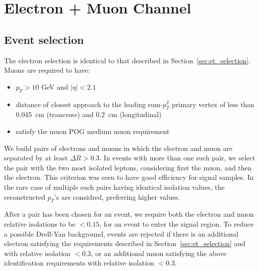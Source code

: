 \section{Electron + Muon Channel}\label{sec:eMu}

\subsection{Event selection}\label{sec:em_selection}


The electron selection is identical to that described in
Section~\ref{sec:et_selection}.  Muons are required to have:
\begin{itemize}
  \item $p_{T} > 10$ GeV and $\vert \eta \vert < 2.1$
  \item distance of closest approach to the leading sum-$p_T^2$ 
    primary vertex of less than 0.045~cm (transvese) and 0.2~cm (longitudinal)
  \item satisfy the muon POG medium muon requirement
\end{itemize}

We build pairs of electrons and muons in which the electron and muon
are separated by at least $\Delta R > 0.3$.  In events with more than
one such pair, we select the pair with the two most isolated leptons,
considering first the muon, and then the electron.  This criterion was
seen to have good efficiency for signal samples.  In the rare case of
multiple such pairs having identical isolation values, the
reconstructed $p_T$'s are considred, preferring higher values.

After a pair has been chosen for an event, we require both the
electron and muon relative isolations to be $<0.15$, for an event to
enter the signal region.  To reduce a possible Drell-Yan background,
events are rejected if there is an additional electron satisfying the
requirements described in Section~\ref{sec:et_selection} and with
relative isolation $<0.3$, or an additional muon satisfying the above
identification requirements with relative isolation $<0.3$.


